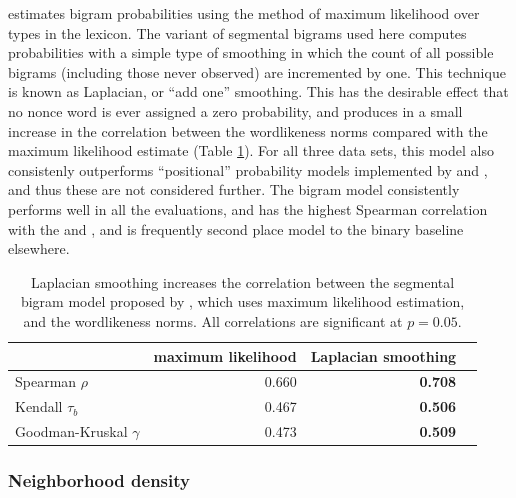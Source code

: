 \citeauthor{Albright2009a} estimates bigram probabilities using the method of maximum likelihood over types in the lexicon. The variant of segmental bigrams used here computes probabilities with a simple type of smoothing in which the count of all possible bigrams (including those never observed) are incremented by one. This technique is known as Laplacian, or ``add one'' smoothing. This has the desirable effect that no nonce word is ever assigned a zero probability, and produces in a small increase in the correlation between the \citeauthor{Albright2003b} wordlikeness norms compared with the maximum likelihood estimate (Table \ref{albrightimproved}). For all three data sets, this model also consistenly outperforms ``positional'' probability models implemented by \citet{Vitevitch2004} and \citet{Vaden2009}, and thus these are not considered further. The bigram model consistently performs well in all the evaluations, and has the highest Spearman correlation with the \citeauthor{Greenberg1964} and \citeauthor{Scholes1966}, and is frequently second place model to the binary baseline elsewhere.

\begin{table} \label{albrightimproved}
\centering
\begin{tabular}{l r r r}
\toprule
                         & maximum likelihood & Laplacian smoothing \\
\midrule
Spearman $\rho$          & 0.660              & \textbf{0.708} \\
Kendall $\tau_b$         & 0.467              & \textbf{0.506} \\
Goodman-Kruskal $\gamma$ & 0.473              & \textbf{0.509} \\
\bottomrule
\end{tabular}
\caption{Laplacian smoothing increases the correlation between the segmental bigram model proposed by \citet{Albright2009a}, which uses maximum likelihood estimation, and the \citet{Albright2003b} wordlikeness norms. All correlations are significant at $p = 0.05$.}
\end{table}

\subsubsection{Neighborhood density}

